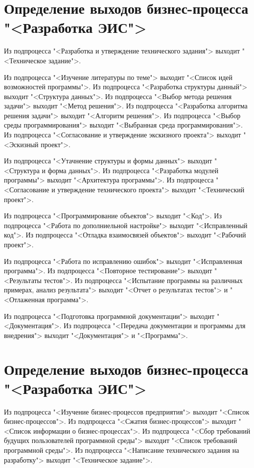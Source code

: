 {\section{Определение выходов бизнес-процесса "<Разработка ЭИС">}
Из подпроцесса "<Разработка и утверждение технического задания">
выходит "<Техническое задание">.

Из подпроцесса "<Изучение литературы по теме">
выходит "<Список идей возможностей программы">.
Из подпроцесса "<Разработка структуры данный">
выходит "<Структура данных">.
Из подпроцесса "<Выбор метода решения задачи">
выходит "<Метод решения">.
Из подпроцесса "<Разработка алгоритма решения задачи">
выходит "<Алгоритм решения">.
Из подпроцесса "<Выбор среды программирования">
выходит "<Выбранная среда программирования">.
Из подпроцесса "<Согласование и утверждение экскизного проекта">
выходит "<Эскизный проект">.

Из подпроцесса "<Утачнение структуры и формы данных">
выходит "<Структура и форма данных">.
Из подпроцесса "<Разработка модулей программы">
выходит "<Архитектура программы">.
Из подпроцесса "<Согласование и утверждение технического проекта">
выходит "<Технический проект">.

Из подпроцесса "<Программирование объектов"> выходит "<Код">.
Из подпроцесса "<Работа по дополниельной настройке">
выходит "<Исправленный код">.
Из подпроцесса "<Отладка взаимосвязей объектов">
выходит "<Рабочий проект">.

Из подпроцесса "<Работа по исправлению ошибок">
выходит "<Исправленная программа">.
Из подпроцесса "<Повторное тестирование"> выходит "<Результаты тестов">.
Из подпроцесса "<Испытание программы на различных примерах,
анализ результата"> выходит "<Отчет о результатах тестов">
и "<Отлаженная программа">.

Из подпроцесса "<Подготовка программной документации">
выходит "<Документация">.
Из подпроцесса "<Передача документации и программы для внедрения">
выходит "<Документация"> и "<Программа">.

\section{Определение выходов бизнес-процесса "<Разработка ЭИС">}
Из подпроцесса "<Изучение бизнес-процессов предприятия">
выходит "<Список бизнес-процессов">.
Из подпроцесса "<Сжатия бизнес-процессов">
выходит "<Список информации о бизнес-процессах">.
Из подпроцесса "<Сбор требований будущих пользователей программной среды">
выходит "<Список требований программной среды">.
Из подпроцесса "<Написание технического задания на разработку">
выходит "<Техническое задание">.

}
